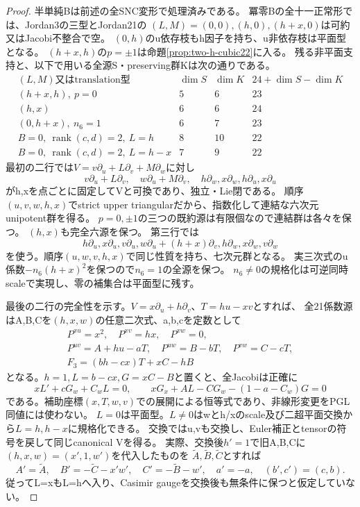 \documentclass[a4paper,11pt]{ltjsarticle}
\theoremstyle{definition}
\begin{document}
\begin{proof}
半単純Bは前述の全SNC変形で処理済みである。
冪零Bの全十一正常形では、Jordan3の三型とJordan21の
$(L,M)=(0,0),(h,0),(h+x,0)$は可約又はJacobi不整合で空。
$(0,h)$のu依存枝もh因子を持ち、u非依存枝は平面型となる。
$(h+x,h)$の$p=\pm1$は命題\ref{prop:two-h-cubic22}に入る。
残る非平面支持と、以下で用いる全源S・preserving群Kは次の通りである。
\[
\begin{array}{c|r|r|r}
 (L,M)\text{又はtranslation型}&\dim S&\dim K&24+\dim S-\dim K\\\hline
 (h+x,h),\ p=0&5&6&23\\
 (h,x)&6&6&24\\
 (0,h+x),\ n_6=1&6&7&23\\
 B=0,\ \operatorname{rank}(c,d)=2,\ L=h&8&10&22\\
 B=0,\ \operatorname{rank}(c,d)=2,\ L=h-x&7&9&22
\end{array}
\]
最初の二行では$V=v\partial_u+L\partial_v+M\partial_w$に対し
\[
 v\partial_u+L\partial_v,\quad w\partial_u+M\partial_v,\quad
 h\partial_w,x\partial_w,h\partial_u,x\partial_u
\]
がh,xを点ごとに固定してVと可換であり、独立・Lie閉である。
順序$(u,v,w,h,x)$でstrict upper triangularだから、指数化して連結な六次元unipotent群を得る。
$p=0,\pm1$の三つの既約源は有限個なので連結群は各々を保つ。
$(h,x)$も完全六源を保つ。
第三行では
\[
 h\partial_u,x\partial_u,v\partial_u,
 w\partial_u+(h+x)\partial_v,h\partial_w,x\partial_w,v\partial_w
\]
を使う。順序$(u,w,v,h,x)$で同じ性質を持ち、七次元群となる。
実三次式のu係数$-n_6(h+x)^2$を保つので$n_6=1$の全源を保つ。
$n_6\ne0$の規格化は可逆同時scaleで実現し、零の補集合は平面型に残す。

最後の二行の完全性を示す。$V=x\partial_u+h\partial_v$、$T=hu-xv$とすれば、
全21係数源はA,B,Cを$(h,x,w)$の任意二次式、a,b,cを定数として
\[
 \begin{gathered}
 P^{xu}=x^2,\quad P^{xv}=hx,\quad P^{xw}=0,\\
 P^{uv}=A+hu-aT,\quad P^{uw}=B-bT,\quad P^{vw}=C-cT,\\
 F_3=(bh-cx)T+xC-hB
 \end{gathered}
\]
となる。$h=1,L=b-cx,G=xC-B$と置くと、全Jacobiは正確に
\[
 xL'+cG_w+C_wL=0,\qquad
 xG_x+AL-CG_w-(1-a-C_w)G=0
\]
である。補助座標$(x,T,w,v)$での展開による恒等式であり、非線形変更をPGL同値には使わない。
$L=0$は平面型。$L\ne0$はwとh/xのscale及び二超平面交換から$L=h,h-x$に規格化できる。
交換ではu,vも交換し、Euler補正とtensorの符号を戻して同じcanonical Vを得る。
実際、交換後$h'=1$で旧A,B,Cに$(h,x,w)=(x',1,w')$を代入したものを
$\widetilde A,\widetilde B,\widetilde C$とすれば
\[
 A'=\widetilde A,\quad B'=-\widetilde C-x'w',\quad
 C'=-\widetilde B-w',\quad a'=-a,\quad(b',c')=(c,b).
\]
従ってL=xもL=hへ入り、Casimir gaugeを交換後も無条件に保つと仮定していない。


\end{proof}
\end{document}
